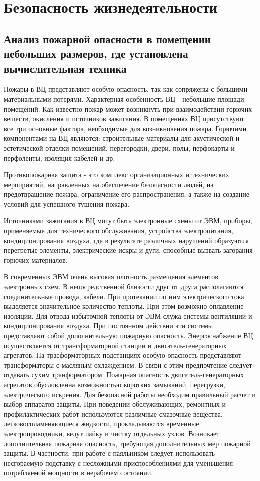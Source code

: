 \setcounter{section}{3}
\section{Безопасность жизнедеятельности}

\subsection{Анализ пожарной опасности в помещении небольших размеров, где установлена вычислительная техника}

Пожары в ВЦ представляют особую опасность, так как сопряжены с большими материальными потерями.
Характерная особенность ВЦ - небольшие площади помещений. Как известно пожар может возникнуть при взаимодействии
горючих веществ, окисления и источников зажигания. В помещениях ВЦ присутствуют все три основные фактора,
необходимые для возникновения пожара. Горючими компонентами на ВЦ являются: строительные материалы для
акустической и эстетической отделки помещений, перегородки, двери, полы, перфокарты и перфоленты, изоляция кабелей и др.

Противопожарная защита - это комплекс организационных и технических мероприятий, направленных на обеспечение безопасности людей,
на предотвращение пожара, ограничение его распространения, а также на создание условий для успешного тушения пожара.

Источниками зажигания в ВЦ могут быть электронные схемы от ЭВМ, приборы, применяемые для технического обслуживания,
устройства электропитания, кондиционирования воздуха, где в результате различных нарушений образуются перегретые элементы,
электрические искры и дуги, способные вызвать загорания горючих материалов.

В современных ЭВМ очень высокая плотность размещения элементов электронных схем. В непосредственной близости
друг от друга располагаются соединительные провода, кабели. При протекании по ним электрического тока выделяется
значительное количество теплоты. При этом возможно оплавление изоляции. Для отвода избыточной теплоты от ЭВМ служа
системы вентиляции и кондиционирования воздуха. При постоянном действии эти системы представляют собой дополнительную
пожарную опасность. Энергоснабжение ВЦ осуществляется от трансформаторной станции и двигатель-генераторных агрегатов.
На трасформаторных подстанциях особую опасность представляют трансформаторы с масляным охлаждением. В связи с этим
предпочтение следует отдавать сухим транформатором. Пожарная опасность двигатель-генераторных агрегатов обусловленна
возможностью коротких замыканий, перегрузки, электрического искрения. Для безопасной работы необходим правильный
расчет и выбор аппаратов защиты. При поведении обслуживающих, ремонтных и профилактических работ используются
различные смазочные вещества, легковоспламеняющиеся жидкости, прокладываются временные электропроводники, ведут пайку
и чистку отдельных узлов. Возникает дополнительная пожарная опасность, требующая дополнительных мер пожарной защиты.
В частности, при работе с паяльником следует использовать несгораемую подставку с несложными приспособлениями
для уменьшения потребляемой мощности в нерабочем состоянии.

